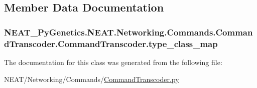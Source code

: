 \subsection{Member Data Documentation}
\subsubsection[{\texorpdfstring{type\+\_\+class\+\_\+map}{type_class_map}}]{\setlength{\rightskip}{0pt plus 5cm}N\+E\+A\+T\+\_\+\+Py\+Genetics.\+N\+E\+A\+T.\+Networking.\+Commands.\+Command\+Transcoder.\+Command\+Transcoder.\+type\+\_\+class\+\_\+map\hspace{0.3cm}{\ttfamily [static]}}\hypertarget{classNEAT__PyGenetics_1_1NEAT_1_1Networking_1_1Commands_1_1CommandTranscoder_1_1CommandTranscoder_a161a64d3c2586008802d174ebc5b6e4b}{}\label{classNEAT__PyGenetics_1_1NEAT_1_1Networking_1_1Commands_1_1CommandTranscoder_1_1CommandTranscoder_a161a64d3c2586008802d174ebc5b6e4b}


The documentation for this class was generated from the following file\+:\begin{DoxyCompactItemize}
\item 
N\+E\+A\+T/\+Networking/\+Commands/\hyperlink{CommandTranscoder_8py}{Command\+Transcoder.\+py}\end{DoxyCompactItemize}
